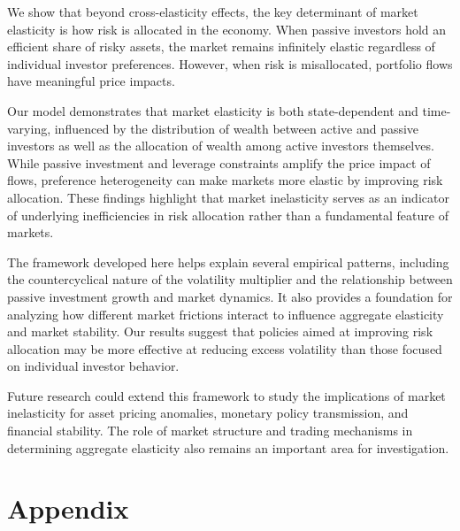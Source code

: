 We show that beyond cross-elasticity effects, the key determinant of market elasticity is how risk is allocated in the economy. When passive investors hold an efficient share of risky assets, the market remains infinitely elastic regardless of individual investor preferences. However, when risk is misallocated, portfolio flows have meaningful price impacts.

Our model demonstrates that market elasticity is both state-dependent and time-varying, influenced by the distribution of wealth between active and passive investors as well as the allocation of wealth among active investors themselves. While passive investment and leverage constraints amplify the price impact of flows, preference heterogeneity can make markets more elastic by improving risk allocation. These findings highlight that market inelasticity serves as an indicator of underlying inefficiencies in risk allocation rather than a fundamental feature of markets.

The framework developed here helps explain several empirical patterns, including the countercyclical nature of the volatility multiplier and the relationship between passive investment growth and market dynamics. It also provides a foundation for analyzing how different market frictions interact to influence aggregate elasticity and market stability. Our results suggest that policies aimed at improving risk allocation may be more effective at reducing excess volatility than those focused on individual investor behavior.

Future research could extend this framework to study the implications of market inelasticity for asset pricing anomalies, monetary policy transmission, and financial stability. The role of market structure and trading mechanisms in determining aggregate elasticity also remains an important area for investigation.

\newpage
\singlespacing
% 
\clearpage



\clearpage
{}
\setcounter{table}{0}
\renewcommand{\thetable}{A.\arabic{table}}
\setcounter{figure}{0}
\renewcommand{\thefigure}{A.\arabic{figure}}
\setcounter{footnote}{0} 

\appendix
\onehalfspacing
\part*{Appendix}\label{appendix}

